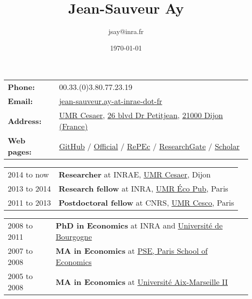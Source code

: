 \documentclass[11pt, a4paper]{./style}
\author{jsay@inra.fr}
\date{\today}
\title{Jean-Sauveur Ay}
\begin{document}
\maketitle


\label{sec:org0c14774}

\begin{center}
\begin{tabular}{ll}
\textbf{Phone:} & 00.33.(0)3.80.77.23.19\\
\textbf{Email:} & \href{mailto:jean-sauveur.ay@inrae.fr}{jean-sauveur.ay-at-inrae-dot-fr}\\
\textbf{Address:} & \href{https://www2.dijon.inrae.fr/cesaer/en/axis/}{UMR Cesaer}, \href{https://www.google.com/maps/?q\%3D47.3097819,5.0644835}{26 blvd Dr Petitjean}, \href{https://www.google.com/maps/place/21000+Dijon/}{21000 Dijon (France)}\\
\textbf{Web pages:} & \href{http://github.com/jsay/}{GitHub} / \href{https://www2.dijon.inrae.fr/cesaer/membres/jean-sauveur-ay/}{Official} / \href{https://ideas.repec.org/e/pay77.html}{RePEc} / \href{https://www.researchgate.net/profile/Jean\_Sauveur\_Ay}{ResearchGate} / \href{https://scholar.google.fr/citations?user=arEwxlIAAAAJ\&hl=fr}{Scholar}\\
\end{tabular}
\end{center}

\label{sec:org5881e52}

\begin{center}
\begin{tabular}{ll}
2014 to now & \textbf{Researcher} at INRAE, \href{https://www2.dijon.inrae.fr/cesaer/en/axis/}{UMR Cesaer}, Dijon\\
2013 to 2014 & \textbf{Research fellow} at INRA, \href{https://www6.versailles-grignon.inrae.fr/economie\_publique\_eng/}{UMR Éco Pub}, Paris\\
2011 to 2013 & \textbf{Postdoctoral fellow} at CNRS, \href{http://cesco.mnhn.fr/en}{UMR Cesco}, Paris\\
\end{tabular}
\end{center}

\label{sec:org4c09530}

\begin{center}
\begin{tabular}{ll}
2008 to 2011 & \textbf{PhD in Economics} at INRA and \href{http://en.u-bourgogne.fr/}{Université de Bourgogne}\\
2007 to 2008 & \textbf{MA in Economics} at \href{https://www.parisschoolofeconomics.eu/en/}{PSE, Paris School of Economics}\\
2005 to 2008 & \textbf{MA in Economics} at \href{https://www.amse-aixmarseille.fr/en}{Université Aix-Marseille II}\\
\end{tabular}
\end{center}
\end{document}
